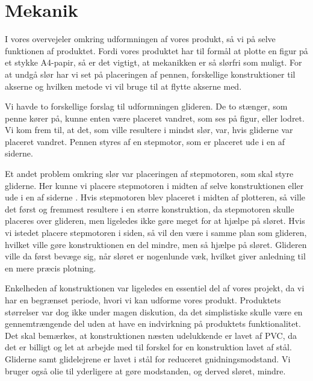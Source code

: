 \chapter[Mekanikdesign]{Mekanik}


I vores overvejeler omkring udformningen af vores produkt, så vi på
selve funktionen af produktet. Fordi vores produktet har til formål at
plotte en figur på et stykke A4-papir, så er det vigtigt, at
mekanikken er så slørfri som muligt. For at undgå slør har vi set på
placeringen af pennen, forskellige konstruktioner til akserne og
hvilken metode vi vil bruge til at flytte akserne med.

Vi havde to forskellige forslag til udformningen glideren. De to
stænger, som penne kører på, kunne enten være placeret vandret, som
ses på figur, eller lodret. Vi kom frem
til, at det, som ville resultere i mindst slør, var, hvis gliderne var
placeret vandret. Pennen styres af en stepmotor, som er placeret ude i
en af siderne.

Et andet problem omkring slør var placeringen af stepmotoren, som skal
styre gliderne. Her kunne vi placere stepmotoren i midten af selve
konstruktionen eller ude i en af siderne . Hvis
stepmotoren blev placeret i midten af plotteren, så ville det først og
fremmest resultere i en større konstruktion, da stepmotoren skulle
placeres over glideren, men ligeledes ikke gøre meget for at hjælpe på
sløret. Hvis vi istedet placere stepmotoren i siden, så vil den være i
samme plan som glideren, hvilket ville gøre konstruktionen en del
mindre, men så hjælpe på sløret. Glideren ville da først bevæge sig,
når sløret er nogenlunde væk, hvilket giver anledning til en mere
præcis plotning.

Enkelheden af konstruktionen var ligeledes en essentiel del af vores
projekt, da vi har en begrænset periode, hvori vi kan udforme vores
produkt. Produktets størrelser var dog ikke under magen diskution, da
det simplistiske skulle være en gennemtrængende del uden at have en
indvirkning på produktets funktionalitet. Det skal bemærkes, at
konstruktionen næsten udelukkende er lavet af PVC, da det er billigt
og let at arbejde med til forskel for en konstruktion lavet af
stål. Gliderne samt glidelejrene er lavet i stål for reduceret
gnidningsmodstand. Vi bruger også olie til yderligere at gøre
modstanden, og derved sløret, mindre.


